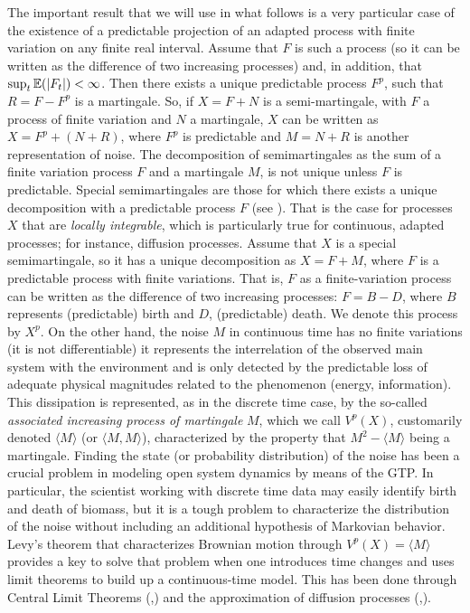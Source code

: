 \documentclass[12pt]{article}
\begin{document}
The important result that we will use in what follows is a very particular case of the existence of a predictable projection of an adapted process with finite variation on any finite real interval. Assume that $F$ is such a process (so it can be written as the difference of two increasing processes) and, in addition, that $\sup_t\mathbb{E}(\left\vert F_t\right\vert)<\infty$. Then there exists a unique predictable process $F^p$, such that $R=F-F^p$ is a martingale. So, if $X=F+N$ is a semi-martingale, with $F$ a process of finite variation and $N$ a martingale, $X$ can be written as $X=F^p+(N+R)$, where $F^p$ is predictable and $M=N+R$ is another representation of noise. The decomposition of semimartingales as the sum of a finite variation process $F$ and a martingale $M$, is not unique unless $F$ is predictable. Special semimartingales are those for which there exists a unique decomposition with a predictable process $F$  (see \cite{Dellacherie-Meyer}). That is the case for processes $X$ that are \textit{locally integrable}, which is particularly true for continuous, adapted processes; for instance, diffusion processes. Assume that $X$ is a special semimartingale, so it has a unique decomposition as $X=F+M$, where $F$ is a predictable process with finite variations. That is, $F$ as a finite-variation process can be written as the difference of two increasing processes: $F=B-D$, where $B$ represents (predictable) birth and $D$, (predictable) death. We denote this process by $X^p$. On the other hand, the noise $M$ in continuous time has no finite variations (it is not differentiable) it represents the interrelation of the observed main system with the environment and is only detected by the predictable loss of adequate physical magnitudes related to the phenomenon (energy, information). This dissipation is represented, as in the discrete time case, by the so-called \textit{associated increasing process of martingale} $M$, which we call $V^p(X)$, customarily denoted $\langle M\rangle$ (or $\langle M,M\rangle$), characterized by the property that $M^2-\langle M\rangle$ being a martingale. Finding the state (or probability distribution) of the noise has been a crucial problem in modeling open system dynamics by means of the GTP. In particular, the scientist working with discrete time data may easily identify birth and death of biomass, but it is a tough problem to characterize the distribution of the noise without including an additional hypothesis of Markovian behavior. Levy's theorem that characterizes Brownian motion through $V^p(X)=\langle M\rangle$ provides a key to solve that problem when one introduces time changes and uses limit theorems to build up a continuous-time model. This has been done through Central Limit Theorems (\cite{CLT-1980},\cite{CNS-CLT1980}) and the approximation of diffusion processes (\cite{Rebolledo:1979vk},\cite{Platen:1985vl}). 
\end{document}
